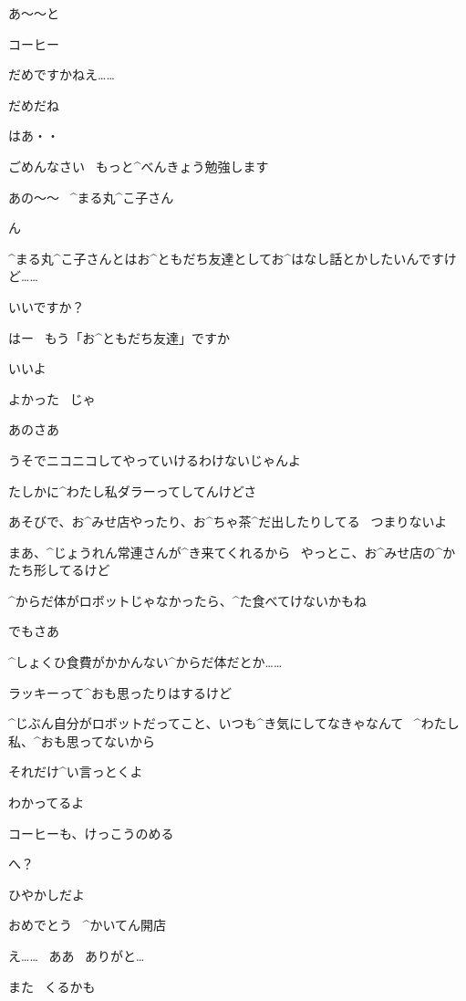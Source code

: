 \page[31]
\Alpha あ〜〜と

\Alpha コーヒー

\Alpha だめですかねえ……

\Maruko だめだね

\Alpha はあ・・

\page[32]
\Alpha ごめんなさい
\ もっと^{べんきょう}{勉強}します

\page[33]
\Alpha あの〜〜
\ ^{まる}{丸}^{こ}{子}さん

\Maruko ん

\Alpha ^{まる}{丸}^{こ}{子}さんとはお^{ともだち}{友達}としてお^{はなし}{話}とかしたいんですけど……

\Alpha いいですか？

\Maruko はー
\ もう「お^{ともだち}{友達}」ですか

\Maruko いいよ

\Alpha よかった
\ じゃ

\page[34]
\Alpha あのさあ

\Alpha うそでニコニコしてやっていけるわけないじゃんよ

\page[35]
\Alpha たしかに^{わたし}{私}ダラーってしてんけどさ

\Alpha あそびで、お^{みせ}{店}やったり、お^{ちゃ}{茶}^{だ}{出}したりしてる
\ つまりないよ

\Alpha まあ、^{じょうれん}{常連}さんが^{き}{来}てくれるから
\ やっとこ、お^{みせ}{店}の^{かたち}{形}してるけど

\Alpha ^{からだ}{体}がロボットじゃなかったら、^{た}{食}べてけないかもね

\Alpha でもさあ

\page[36]
\Alpha ^{しょくひ}{食費}がかかんない^{からだ}{体}だとか……

\Alpha ラッキーって^{おも}{思}ったりはするけど

\Alpha ^{じぶん}{自分}がロボットだってこと、いつも^{き}{気}にしてなきゃなんて
\ ^{わたし}{私}、^{おも}{思}ってないから

\Alpha それだけ^{い}{言}っとくよ

\page[37]
\Maruko わかってるよ

\Maruko コーヒーも、けっこうのめる

\Alpha へ？

\page[38]
\Maruko ひやかしだよ

\Maruko おめでとう
\ ^{かいてん}{開店}

\Alpha え……
\ ああ
\ ありがと…

\page[39]
\Maruko また
\ くるかも

